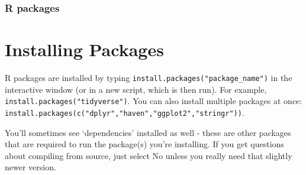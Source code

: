 \documentclass[
  letterpaper,
  DIV=11,
  numbers=noendperiod]{scrreprt}
\begin{document}
\hypertarget{r-packages}{%
\subsection{R packages}\label{r-packages}}

\begin{tcolorbox}[enhanced jigsaw, colframe=quarto-callout-tip-color-frame, opacityback=0, leftrule=.75mm, bottomrule=.15mm, rightrule=.15mm, left=2mm, toptitle=1mm, colback=white, bottomtitle=1mm, titlerule=0mm, title=\textcolor{quarto-callout-tip-color}{\faLightbulb}\hspace{0.5em}{Tip}, arc=.35mm, toprule=.15mm, breakable, coltitle=black, colbacktitle=quarto-callout-tip-color!10!white, opacitybacktitle=0.6]


\hypertarget{installing-packages}{%
\chapter{Installing Packages}\label{installing-packages}}

R packages are installed by typing
\texttt{install.packages("package\_name")} in the interactive window (or
in a new script, which is then run). For example,
\texttt{install.packages("tidyverse")}. You can also install multiple
packages at once:
\texttt{install.packages(c("dplyr","haven","ggplot2","stringr"))}.

You'll sometimes see `dependencies' installed as well - these are other
packages that are required to run the package(s) you're installing. If
you get questions about compiling from source, just select No unless you
really need that slightly newer version.

\end{tcolorbox}
\end{document}
